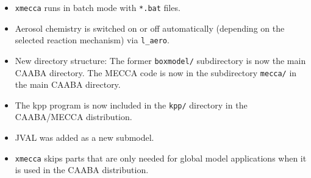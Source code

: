 \documentclass[twoside]{article}
\def\nosep{\setlength\parsep{0mm}\setlength\topsep{0mm}\setlength\itemsep{0mm}}
\begin{document}
\begin{itemize}\nosep
\item \verb|xmecca| runs in batch mode with \verb|*.bat| files.
\item Aerosol chemistry is switched on or off automatically (depending
  on the selected reaction mechanism) via \verb|l_aero|.
\item New directory structure: The former \verb|boxmodel/| subdirectory
  is now the main CAABA directory. The MECCA code is now in the
  subdirectory \verb|mecca/| in the main CAABA directory.
\item The kpp program is now included in the \verb|kpp/| directory in
  the CAABA/MECCA distribution.
\item JVAL was added as a new submodel.
\item \verb|xmecca| skips parts that are only needed for global model
  applications when it is used in the CAABA distribution.
\end{itemize}

\end{document}
